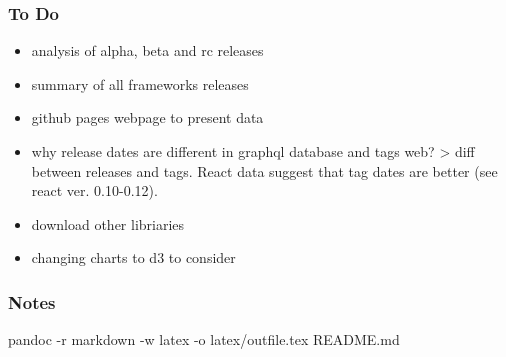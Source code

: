 \subsubsection{To Do}\label{to-do}

\begin{itemize}
\tightlist
\item
  analysis of alpha, beta and rc releases
\item
  summary of all frameworks releases
\item
  github pages webpage to present data
\item
  why release dates are different in graphql database and tags web?
  \textgreater{} diff between releases and tags. React data suggest that
  tag dates are better (see react ver. 0.10-0.12).
\item
  download other libriaries
\item
  changing charts to d3 to consider
\end{itemize}

\subsubsection{Notes}\label{notes}

pandoc -r markdown -w latex -o latex/outfile.tex README.md
